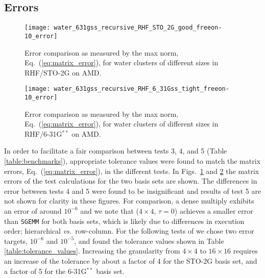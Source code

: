 \subsection{Errors}

\begin{figure}
\texttt{[image: water\_631gss\_recursive\_RHF\_STO\_2G\_good\_freeon-10\_error]}
\caption{\label{fig:water_631gss_RHF_STO_2G_good_error_AMD} Error comparison as
measured by the max norm, Eq.~(\ref{eq:matrix_error}), for water clusters of
different sizes in RHF/STO-2G on AMD.}
\end{figure}

\begin{figure}
\texttt{[image: water\_631gss\_recursive\_RHF\_6\_31Gss\_tight\_freeon-10\_error]}
\caption{\label{fig:water_631gss_RHF_6_31Gss_tight_error_AMD} Error comparison
as measured by the max norm, Eq.~(\ref{eq:matrix_error}), for water clusters of
different sizes in RHF/6-31G${}^{**}$ on AMD.}
\end{figure}

In order to facilitate a fair comparison between tests 3, 4, and 5
(Table \ref{table:benchmarks}), appropriate tolerance values were found to
match the matrix errors, Eq.~(\ref{eq:matrix_error}), in the different tests.
In Figs.~\ref{fig:water_631gss_RHF_STO_2G_good_error_AMD} and
\ref{fig:water_631gss_RHF_6_31Gss_tight_error_AMD} the matrix errors of the
test calculations for the two basis sets are shown. The differences in error
between tests 4 and 5 were found to be insignificant and results of test 5 are
not shown for clarity in these figures.  For comparison, a dense multiply
exhibits an error of around $10^{-6}$ and we note that \SpAMM{}($4 \times 4$,
$\tau = 0$) achieves a smaller error than {\tt SGEMM} for both basis sets,
which is likely due to differences in execution order; hierarchical
\emph{vs.}~row-column.  For the following tests of \SpAMM{} we chose two error
targets, $10^{-6}$ and $10^{-5}$, and found the tolerance values shown in
Table \ref{table:tolerance_values}. Increasing the granularity from $4 \times
4$ to $16 \times 16$ requires an increase of the tolerance by about a factor
of 4 for the STO-2G basis set, and a factor of 5 for the 6-31G${}^{**}$ basis
set.


